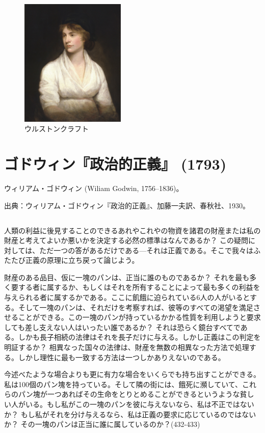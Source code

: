  \begin{figure}[htbp]
   \centering
     \includegraphics[width=50mm]{images/Marywollstonecraft.jpg}
   \caption{ウルストンクラフト}
 \end{figure}



\section{ゴドウィン『政治的正義』 (1793)}

ウィリアム・ゴドウィン (Wiliam Godwin, 1756--1836)。

出典：ウィリアム・ゴドウィン『政治的正義』、加藤一夫訳、春秋社、1930。


\subsection{}



人類の利益に後見することのできるあれやこれやの物資を諸君の財産または私の財産と考えてよいか悪いかを決定する必然の標準はなんであるか？ この疑問に対しては、ただ一つの答があるだけである{\——}それは正義である。そこで我々はふたたび正義の原理に立ち戻って論じよう。


財産のある品目、仮に一塊のパンは、正当に誰のものであるか？ それを最も多く要する者に属するか、もしくはそれを所有することによって最も多くの利益を与えられる者に属するかである。ここに飢餓に迫られている6人の人がいるとする。そして一塊のパンは、それだけを考察すれば、彼等のすべての渇望を満足させることができる。この一塊のパンが持っているかかる性質を利用しようと要求しても差し支えない人はいったい誰であるか？ それは恐らく鏡台すべてである。しかも長子相続の法律はそれを長子だけに与える。しかし正義はこの判定を明証するか？ 相異なった国々の法律は、財産を無数の相異なった方法で処理する。しかし理性に最も一致する方法は一つしかありえないのである。

今述べたような場合よりも更に有力な場合をいくらでも持ち出すことができる。私は100個のパン塊を持っている。そして隣の街には、餓死に瀕していて、これらのパン塊が一つあればその生命をとりとめることができるというような貧しい人がいる。もし私がこの一塊のパンを彼に与えないなら、私は不正ではないか？ もし私がそれを分け与えるなら、私は正義の要求に応じているのではないか？ その一塊のパンは正当に誰に属しているのか？(432-433)



